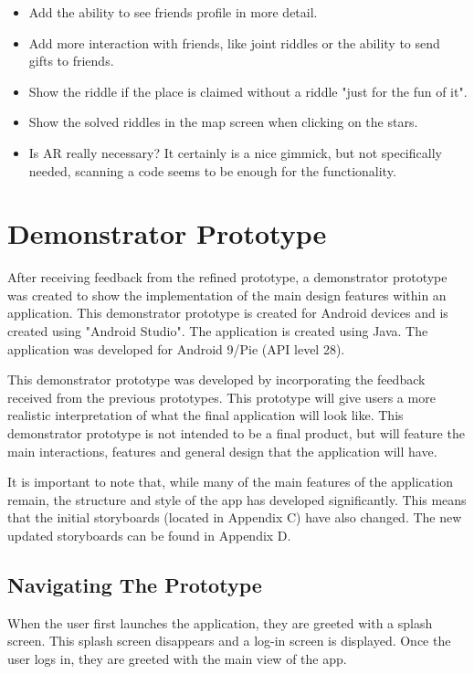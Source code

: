 \documentclass[10pt,twocolumn]{article} %
\begin{document}
\begin{itemize}[noitemsep]
  \item Add the ability to see friends profile in more detail.
  \item Add more interaction with friends, like joint riddles or the ability to send gifts to friends.
  \item Show the riddle if the place is claimed without a riddle "just for the fun of it".
  \item Show the solved riddles in the map screen when clicking on the stars.
  \item Is AR really necessary? It certainly is a nice gimmick, but not specifically needed, scanning a code seems to be enough for the functionality.
\end{itemize}

\section*{Demonstrator Prototype}

After receiving feedback from the refined prototype, a demonstrator prototype was created to show the implementation of the main design features within an application. This demonstrator prototype is created for Android devices and is created using "Android Studio". The application is created using Java. The application was developed for Android 9/Pie (API level 28).

This demonstrator prototype was developed by incorporating the feedback received from the previous prototypes. This prototype will give users a more realistic interpretation of what the final application will look like. This demonstrator prototype is not intended to be a final product, but will feature the main interactions, features and general design that the application will have.

It is important to note that, while many of the main features of the application remain, the structure and style of the app has developed significantly. This means that the initial storyboards (located in Appendix C) have also changed. The new updated storyboards can be found in Appendix D. 
\subsection*{Navigating The Prototype}
When the user first launches the application, they are greeted with a splash screen. This splash screen disappears and a log-in screen is displayed. Once the user logs in, they are greeted with the main view of the app.
\end{document}
